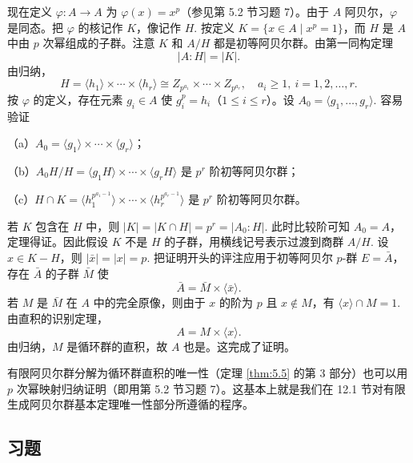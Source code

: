 现在定义 \(\varphi : A \to A\) 为 \(\varphi(x) = x^p\)（参见第 5.2 节习题 7）。由于 \(A\) 阿贝尔，\(\varphi\) 是同态。把 \(\varphi\) 的核记作 \(K\)，像记作 \(H\). 按定义 \(K = \{x \in A \mid x^p = 1\}\)，而 \(H\) 是 \(A\) 中由 \(p\) 次幂组成的子群。注意 \(K\) 和 \(A/H\) 都是初等阿贝尔群。由第一同构定理
\[
|A : H| = |K|.
\]
由归纳，
\[
H = \langle h_1 \rangle \times \cdots \times \langle h_r \rangle \cong Z_{p^{a_1}} \times \cdots \times Z_{p^{a_r}}, \quad a_i \geq 1,\ i = 1, 2, \ldots, r.
\]
按 \(\varphi\) 的定义，存在元素 \(g_i \in A\) 使 \(g_i^p = h_i\)（\(1 \leq i \leq r\)）。设 \(A_0 = \langle g_1, \ldots, g_r \rangle\). 容易验证

（a）\(A_0 = \langle g_1 \rangle \times \cdots \times \langle g_r \rangle\)；

（b）\(A_0 H/H = \langle g_1H \rangle \times \cdots \times \langle g_rH \rangle\) 是 \(p^r\) 阶初等阿贝尔群；

（c）\(H \cap K = \langle h_1^{p^{a_1-1}} \rangle \times \cdots \times \langle h_r^{p^{a_r-1}} \rangle\) 是 \(p^r\) 阶初等阿贝尔群。

若 \(K\) 包含在 \(H\) 中，则 \(|K| = |K \cap H| = p^r = |A_0 : H|\). 此时比较阶可知 \(A_0 = A\)，定理得证。因此假设 \(K\) 不是 \(H\) 的子群，用横线记号表示过渡到商群 \(A/H\). 设 \(x \in K - H\)，则 \(|\bar{x}| = |x| = p\). 把证明开头的评注应用于初等阿贝尔 \(p\)-群 \(E = \bar{A}\)，存在 \(\bar{A}\) 的子群 \(\bar{M}\) 使
\[
\bar{A} = \bar{M} \times \langle \bar{x} \rangle.
\]
若 \(M\) 是 \(\bar{M}\) 在 \(A\) 中的完全原像，则由于 \(x\) 的阶为 \(p\) 且 \(x \notin M\)，有 \(\langle x \rangle \cap M = 1\). 由直积的识别定理，
\[
A = M \times \langle x \rangle.
\]
由归纳，\(M\) 是循环群的直积，故 \(A\) 也是。这完成了证明。

有限阿贝尔群分解为循环群直积的唯一性（定理 \ref{thm:5.5} 的第 3 部分）也可以用 \(p\) 次幂映射归纳证明（即用第 5.2 节习题 7）。这基本上就是我们在 12.1 节对有限生成阿贝尔群基本定理唯一性部分所遵循的程序。

\subsection*{习题}

